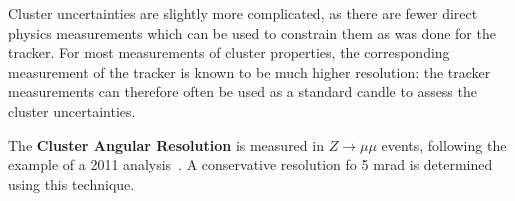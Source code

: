 	Cluster uncertainties are slightly more complicated, as there are fewer direct physics measurements which can be used to constrain them as was done for the tracker. For most measurements of cluster properties, the corresponding measurement of the tracker is known to be much higher resolution: the tracker measurements can therefore often be used as a standard candle to assess the cluster uncertainties.


	The \textbf{Cluster Angular Resolution} is measured in $Z\rightarrow \mu\mu$ events, following the example of a 2011 analysis~\cite{Begel:1290956}. A conservative resolution fo 5 mrad is determined using this technique.  %


